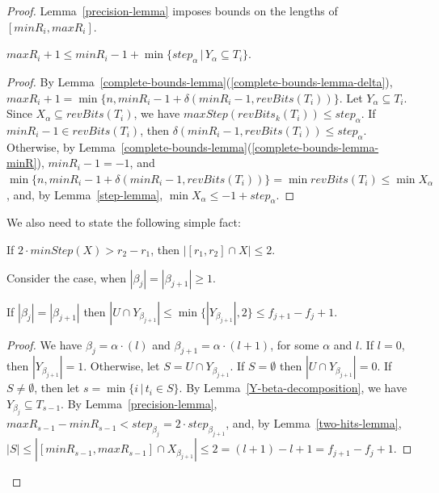 \documentclass{llncs}
\begin{document}
\begin{proof}
Lemma~\ref{precision-lemma} imposes bounds on the lengths of $[minR_i,maxR_i]$.
\begin{lemma}\label{precision-lemma}
$maxR_i+1\le minR_i-1+\min \{step_\alpha\,|\, Y_\alpha\subseteq T_i\}$.
\end{lemma}
\begin{proof}
By Lemma~\ref{complete-bounds-lemma}(\ref{complete-bounds-lemma-delta}),
$maxR_i+1=\min\{n, minR_i-1+\delta(minR_i-1,revBits(T_i))\}$.
%
Let $Y_\alpha\subseteq T_i$. 
Since $X_\alpha\subseteq revBits(T_i)$,
we have $maxStep(revBits_k(T_i))\le step_\alpha$.
If $minR_i-1\in revBits(T_i)$,
then $\delta(minR_i-1,revBits(T_i))\le step_\alpha$.
Otherwise, by Lemma~\ref{complete-bounds-lemma}(\ref{complete-bounds-lemma-minR}),
$minR_i-1=-1$, and 
$\min\{n, minR_i-1+\delta(minR_i-1,revBits(T_i))\}=\min revBits(T_i)\le \min X_\alpha$,
and,
by Lemma~\ref{step-lemma},
 $\min X_\alpha\le -1+step_\alpha$.
\end{proof}

We also need to state the following simple fact:
\begin{lemma}\label{two-hits-lemma}
If $2\cdot minStep(X)> r_2-r_1$, 
then 
$|[r_1, r_2]\cap X|\le 2$.
\end{lemma}


Consider the case, when $|\beta_{j}|=|\beta_{j+1}|\ge 1$.
\begin{lemma}\label{next-level-lemma}
If $|\beta_{j}|=|\beta_{j+1}|$ 
then 
$|U\cap Y_{\beta_{j+1}}|
\le 
\min\{|Y_{\beta_{j+1}}|,2\}
\le 
f_{j+1}-f_j+1$.
\end{lemma}
 
\begin{proof}
We have $\beta_j=\alpha\cdot (l)$ and $\beta_{j+1}=\alpha\cdot (l+1)$,
for some $\alpha$ and $l$.
If $l=0$, then  $|Y_{\beta_{j+1}}|=1$.
Otherwise, let  $S=U\cap Y_{\beta_{j+1}}$.
If $S=\emptyset$ then $|U\cap Y_{\beta_{j+1}}|=0$.
If $S\not=\emptyset$, then let $s=\min\{i\,|\, t_i\in S\}$.
By Lemma~\ref{Y-beta-decomposition}, we have $Y_{\beta_j}\subseteq T_{s-1}$.
By Lemma~\ref{precision-lemma}, $maxR_{s-1}-minR_{s-1}< step_{\beta_j}=2\cdot step_{\beta_{j+1}}$,
and, by Lemma~\ref{two-hits-lemma},
$|S|\le |[minR_{s-1},maxR_{s-1}]\cap X_{\beta_{j+1}}|\le 2= (l+1)-l+1=f_{j+1}-f_j+1$.
\end{proof}


\end{proof}
\end{document}

